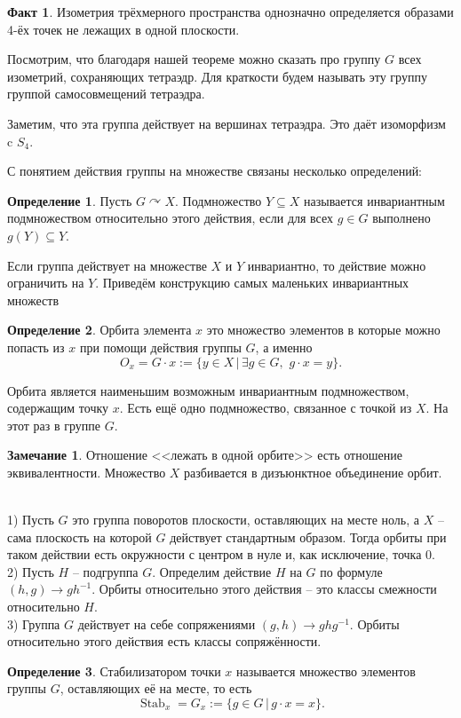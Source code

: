 \documentclass[10pt,a4paper,oneside]{book}
\theoremstyle{definition}
\newtheorem*{rem}{\color{green!50!blue}Замечание}
\newtheorem*{defn}{\color{yellow!30!red} Определение}
\newtheorem*{fact}{Факт}
\newcommand{\Stab}{\operatorname{Stab}}
\def\exm{\noindent {\bf Примеры:}}
\def\dfn{\begin{defn}}
\def\edfn{\end{defn}}
\def\rm{\begin{rem}}
\def\erm{\end{rem}}
\def\fct{\begin{fact}}
\def\efct{\end{fact}}
\begin{document}
\fct Изометрия трёхмерного пространства однозначно определяется образами 4-ёх точек не лежащих в одной плоскости.
\efct

Посмотрим, что благодаря нашей теореме можно сказать про группу $G$ всех изометрий, сохраняющих тетраэдр. Для краткости будем называть эту группу группой самосовмещений тетраэдра. 

Заметим, что эта группа действует на вершинах тетраэдра. Это даёт изоморфизм c $S_4$. 


\noindent С понятием действия группы на множестве связаны несколько определений:

\dfn Пусть $G\curvearrowright X$. Подмножество $Y\subseteq X$ называется инвариантным подмножеством относительно этого действия, если для всех $g\in G$ выполнено $g(Y)\subseteq Y$.
\edfn

Если группа действует на множестве $X$ и $Y$ инвариантно, то действие можно ограничить на $Y$. Приведём конструкцию самых маленьких инвариантных множеств


\dfn
Орбита элемента $x$ это множество элементов в которые можно попасть из $x$ при помощи действия группы $G$, а именно
$$O_x=G\cdot x:=\{y\in X \,|\, \exists g\in G, \,\, g\cdot x=y\}.$$
\edfn

Орбита является наименьшим возможным инвариантным подмножеством, содержащим точку $x$. Есть ещё одно подмножество, связанное с точкой из $X$. На этот раз в группе $G$.

\rm Отношение <<лежать в одной орбите>> есть отношение эквивалентности. Множество $X$ разбивается в дизъюнктное объединение орбит.
\erm

\exm\\
1) Пусть $G$ это группа поворотов плоскости, оставляющих на месте ноль, а $X$ -- сама плоскость на которой $G$ действует стандартным образом. Тогда орбиты при таком действии есть окружности с центром в нуле и, как исключение, точка $0$.\\
2) Пусть $H$ -- подгруппа $G$. Определим действие $H$ на $G$ по формуле $(h,g) \to gh^{-1}$. Орбиты относительно этого действия  -- это классы смежности относительно $H$.\\
3) Группа $G$ действует на себе сопряжениями $(g,h) \to ghg^{-1}$. Орбиты относительно этого действия есть классы сопряжённости.\\

\dfn
Стабилизатором точки $x$ называется множество элементов группы $G$, оставляющих её на месте, то есть
$$\Stab_x=G_x:= \{g\in G \,|\, g\cdot x=x\}.$$
\edfn
\end{document}
